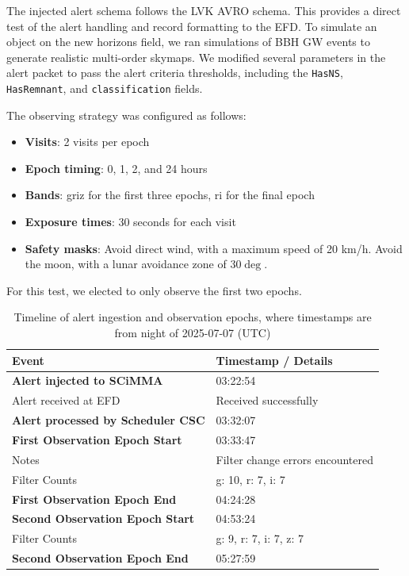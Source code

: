 The injected alert schema follows the LVK AVRO schema. This provides a direct test of the alert handling and record formatting to the EFD. To simulate an object on the new horizons field, we ran simulations of BBH GW events to generate realistic multi-order skymaps. We modified several parameters in the alert packet to pass the alert criteria thresholds, including the \texttt{HasNS}, \texttt{HasRemnant}, and \texttt{classification} fields.

The observing strategy was configured as follows:

\begin{itemize}
    \item \textbf{Visits}: 2 visits per epoch
    \item \textbf{Epoch timing}: 0, 1, 2, and 24 hours
    \item \textbf{Bands}: griz for the first three epochs, ri for the final epoch
    \item \textbf{Exposure times}: 30 seconds for each visit
    \item \textbf{Safety masks}: Avoid direct wind, with a maximum speed of 20 km/h. Avoid the moon, with a lunar avoidance zone of 30$\deg$.
\end{itemize}

For this test, we elected to only observe the first two epochs.

\begin{table}[ht]
\centering
\begin{tabular}{|l|l|}
\hline
\textbf{Event} & \textbf{Timestamp / Details} \\
\hline
\textbf{Alert injected to SCiMMA} & 03:22:54 \\
Alert received at EFD & Received successfully \\
\textbf{Alert processed by Scheduler CSC} & 03:32:07 \\
\hline
\textbf{First Observation Epoch Start} & 03:33:47 \\
Notes & Filter change errors encountered \\
Filter Counts & g: 10, r: 7, i: 7 \\
\textbf{First Observation Epoch End} & 04:24:28 \\
\hline
\textbf{Second Observation Epoch Start} & 04:53:24\\
Filter Counts & g: 9, r: 7, i: 7, z: 7 \\
\textbf{Second Observation Epoch End} & 05:27:59 \\
\hline
\end{tabular}
\caption{Timeline of alert ingestion and observation epochs, where timestamps are from night of 2025-07-07 (UTC)}
\end{table}

